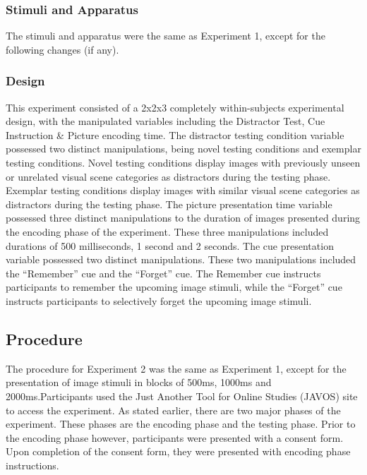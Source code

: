 \documentclass[
  man,floatsintext]{apa6}
\begin{document}
\hypertarget{stimuli-and-apparatus}{%
\subsubsection{Stimuli and Apparatus}\label{stimuli-and-apparatus}}

The stimuli and apparatus were the same as Experiment 1, except for the following changes (if any).

\hypertarget{design-1}{%
\subsubsection{Design}\label{design-1}}

This experiment consisted of a 2x2x3 completely within-subjects experimental design, with the manipulated variables including the Distractor Test, Cue Instruction \& Picture encoding time. The distractor testing condition variable possessed two distinct manipulations, being novel testing conditions and exemplar testing conditions. Novel testing conditions display images with previously unseen or unrelated visual scene categories as distractors during the testing phase. Exemplar testing conditions display images with similar visual scene categories as distractors during the testing phase. The picture presentation time variable possessed three distinct manipulations to the duration of images presented during the encoding phase of the experiment. These three manipulations included durations of 500 milliseconds, 1 second and 2 seconds. The cue presentation variable possessed two distinct manipulations. These two manipulations included the ``Remember'' cue and the ``Forget'' cue. The Remember cue instructs participants to remember the upcoming image stimuli, while the ``Forget'' cue instructs participants to selectively forget the upcoming image stimuli.

\hypertarget{procedure-1}{%
\subsection{Procedure}\label{procedure-1}}

The procedure for Experiment 2 was the same as Experiment 1, except for the presentation of image stimuli in blocks of 500ms, 1000ms and 2000ms.Participants used the Just Another Tool for Online Studies (JAVOS) site to access the experiment. As stated earlier, there are two major phases of the experiment. These phases are the encoding phase and the testing phase. Prior to the encoding phase however, participants were presented with a consent form. Upon completion of the consent form, they were presented with encoding phase instructions.
\end{document}

